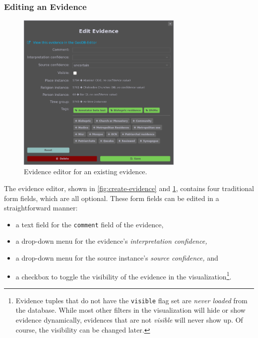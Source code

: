 \subsubsection{Editing an Evidence}
\label{sec:evidence-editing}

\begin{figure}[htb]
  \centering
  \includegraphics[width=8cm]{../src/assets/annotator-documentation/edit-evidence.png}

  \caption{Evidence editor for an existing evidence.}
  \label{fig:edit-evidence}
\end{figure}

The evidence editor, shown in \cref{fig:create-evidence} and \cref{fig:edit-evidence}, contains four traditional form fields, which are all optional.
These form fields can be edited in a straightforward manner:

\begin{itemize}
  \item a text field for the \verb!comment! field of the evidence,
  \item a drop-down menu for the evidence's \emph{interpretation confidence,}
  \item a drop-down menu for the source instance's \emph{source confidence,} and
  \item a checkbox to toggle the visibility of the evidence in the visualization\footnote{
      Evidence tuples that do not have the \texttt{visible} flag set are \emph{never loaded} from the database.
      While most other filters in the visualization will hide or show evidence dynamically, evidences that are not \emph{visible} will never show up.
      Of course, the visibility can be changed later.
    }.
\end{itemize}

